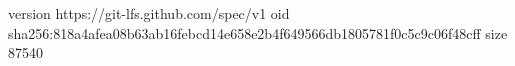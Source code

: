 version https://git-lfs.github.com/spec/v1
oid sha256:818a4afea08b63ab16febcd14e658e2b4f649566db1805781f0c5c9c06f48cff
size 87540
